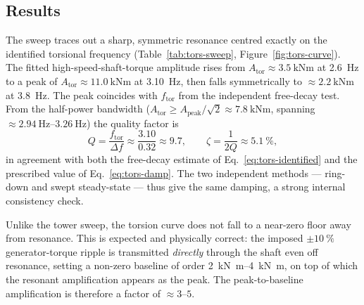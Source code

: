 \subsection{Results}
\label{subsec:tors-results}

The sweep traces out a sharp, symmetric resonance centred exactly on the
identified torsional frequency (Table~\ref{tab:tors-sweep},
Figure~\ref{fig:tors-curve}). The fitted high-speed-shaft-torque amplitude rises
from \(A_{\mathrm{tor}}\approx\SI{3.5}{\kilo\newton\metre}\) at
\SI{2.6}{\hertz} to a peak of
\(A_{\mathrm{tor}}\approx\SI{11.0}{\kilo\newton\metre}\) at \SI{3.10}{\hertz},
then falls symmetrically to \(\approx\SI{2.2}{\kilo\newton\metre}\) at
\SI{3.8}{\hertz}. The peak coincides with \(f_{\mathrm{tor}}\) from the
independent free-decay test. From the half-power bandwidth
(\(A_{\mathrm{tor}} \ge A_{\mathrm{peak}}/\sqrt2 \approx
\SI{7.8}{\kilo\newton\metre}\), spanning \(\approx\SIrange{2.94}{3.26}{\hertz}\))
the quality factor is
\begin{equation}
  Q = \frac{f_{\mathrm{tor}}}{\Delta f} \approx \frac{3.10}{0.32} \approx 9.7,
  \qquad
  \zeta = \frac{1}{2Q} \approx \SI{5.1}{\percent},
  \label{eq:tors-Q}
\end{equation}
in agreement with both the free-decay estimate of
Eq.~\eqref{eq:tors-identified} and the prescribed value of
Eq.~\eqref{eq:tors-damp}. The two independent methods --- ring-down and swept
steady-state --- thus give the same damping, a strong internal consistency
check.

Unlike the tower sweep, the torsion curve does not fall to a near-zero floor
away from resonance. This is expected and physically correct: the imposed
\(\pm\SI{10}{\percent}\) generator-torque ripple is transmitted \emph{directly}
through the shaft even off resonance, setting a non-zero baseline of order
\SIrange{2}{4}{\kilo\newton\metre}, on top of which the resonant amplification
appears as the peak. The peak-to-baseline amplification is therefore a factor of
\(\approx 3\)--\(5\).

